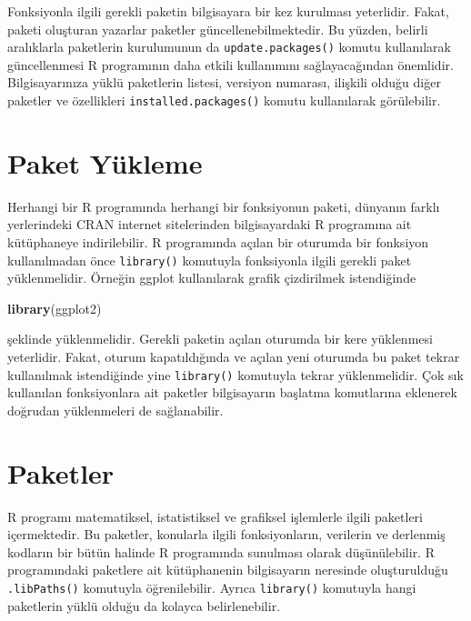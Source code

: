 \documentclass[
]{book}
\newenvironment{Shaded}{\begin{snugshade}}{\end{snugshade}}
\newcommand{\FunctionTok}[1]{\textcolor[rgb]{0.13,0.29,0.53}{\textbf{#1}}}
\newcommand{\NormalTok}[1]{#1}
\begin{document}
Fonksiyonla ilgili gerekli paketin bilgisayara bir kez kurulması yeterlidir. Fakat, paketi oluşturan yazarlar paketler güncellenebilmektedir. Bu yüzden, belirli aralıklarla paketlerin kurulumunun da \texttt{update.packages()} komutu kullanılarak güncellenmesi R programının daha etkili kullanımını sağlayacağından önemlidir. Bilgisayarınıza yüklü paketlerin listesi, versiyon numarası, ilişkili olduğu diğer paketler ve özellikleri \texttt{installed.packages()} komutu kullanılarak görülebilir.

\section{Paket Yükleme}\label{paket-yuxfckleme}

Herhangi bir R programında herhangi bir fonksiyonun paketi, dünyanın farklı yerlerindeki CRAN internet sitelerinden bilgisayardaki R programına ait kütüphaneye indirilebilir. R programında açılan bir oturumda bir fonksiyon kullanılmadan önce \texttt{library()} komutuyla fonksiyonla ilgili gerekli paket yüklenmelidir. Örneğin ggplot kullanılarak grafik çizdirilmek istendiğinde

\begin{Shaded}
\begin{Highlighting}[]
\FunctionTok{library}\NormalTok{(ggplot2)}
\end{Highlighting}
\end{Shaded}

şeklinde yüklenmelidir. Gerekli paketin açılan oturumda bir kere yüklenmesi yeterlidir. Fakat, oturum kapatıldığında ve açılan yeni oturumda bu paket tekrar kullanılmak istendiğinde yine \texttt{library()} komutuyla tekrar yüklenmelidir. Çok sık kullanılan fonksiyonlara ait paketler bilgisayarın başlatma komutlarına eklenerek doğrudan yüklenmeleri de sağlanabilir.

\section{Paketler}\label{paketler}

R programı matematiksel, istatistiksel ve grafiksel işlemlerle ilgili paketleri içermektedir. Bu paketler, konularla ilgili fonksiyonların, verilerin ve derlenmiş kodların bir bütün halinde R programında sunulması olarak düşünülebilir. R programındaki paketlere ait kütüphanenin bilgisayarın neresinde oluşturulduğu \texttt{.libPaths()} komutuyla öğrenilebilir. Ayrıca \texttt{library()} komutuyla hangi paketlerin yüklü olduğu da kolayca belirlenebilir.
\end{document}
